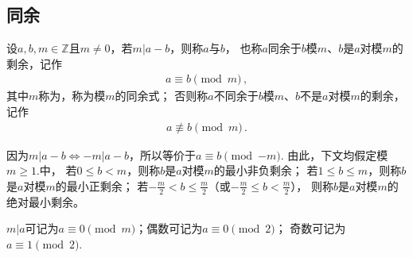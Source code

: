 \subsection{同余}\label{sub:同余}
\begin{definition}
    设$a,b,m\in\mathbb{Z}$且$m\neq0$，若$m|a-b$，则称$a$与$b$，
    也称$a$同余于$b$模$m$、$b$是$a$对模$m$的剩余，记作
    \begin{align}\label{eq:7.ex02.congruent}
        a\equiv b\pmod{m}\, ,
    \end{align}
    其中$m$称为，称为模$m$的同余式；
    否则称$a$不同余于$b$模$m$、$b$不是$a$对模$m$的剩余，记作
    \begin{align}
        a\not\equiv b\pmod{m}\, .
    \end{align}
\end{definition}

因为$m|a-b\Leftrightarrow -m|a-b$，所以等价于$a\equiv b\pmod{-m}$.
由此，下文均假定模$m\ge1$.中，
若$0\le b<m$，则称$b$是$a$对模$m$的最小非负剩余；
若$1\le b\le m$，则称$b$是$a$对模$m$的最小正剩余；
若$\displaystyle -\frac{m}{2}<b\le\frac{m}{2}$（或$\displaystyle -\frac{m}{2}\le b<\frac{m}{2}$），
则称$b$是$a$对模$m$的绝对最小剩余。
\begin{example}
    $m|a$可记为$a\equiv 0\pmod{m}$；偶数可记为$a\equiv 0\pmod{2}$；
    奇数可记为$a\equiv 1\pmod{2}$.
\end{example}




